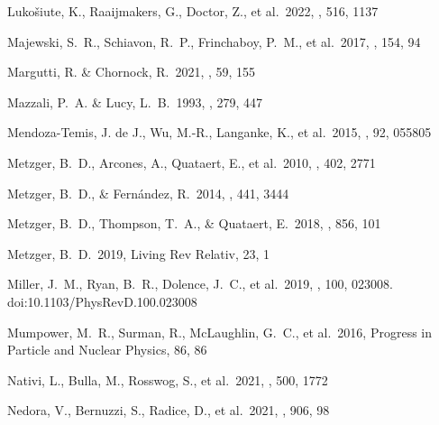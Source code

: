 \documentclass[twocolumn, twocolappendix]{aastex63}
\begin{document}
\begin{thebibliography}{}


 Luko{\v{s}}iute, K., Raaijmakers, G., Doctor, Z., et al.\ 2022, \mnras, 516, 1137


 Majewski, S.~R., Schiavon, R.~P., Frinchaboy, P.~M., et al.\ 2017, \aj, 154, 94

 Margutti, R. \& Chornock, R.\ 2021, \araa, 59, 155

 Mazzali, P.~A. \& Lucy, L.~B.\ 1993, \aap, 279, 447


 Mendoza-Temis, J. de J., Wu, M.-R., Langanke, K., et al.\ 2015, \prc, 92, 055805




 Metzger, B.~D., Arcones, A., Quataert, E., et al.\ 2010, \mnras, 402, 2771




 Metzger, B.~D., \& Fern{\'a}ndez, R.\ 2014, \mnras, 441, 3444


 Metzger, B.~D., Thompson, T.~A., \& Quataert, E.\ 2018, \apj, 856, 101


 Metzger, B.~D.\ 2019, Living Rev Relativ, 23, 1


 Miller, J.~M., Ryan, B.~R., Dolence, J.~C., et al.\ 2019, \prd, 100, 023008. doi:10.1103/PhysRevD.100.023008


 Mumpower, M.~R., Surman, R., McLaughlin, G.~C., et al.\ 2016, Progress in Particle and Nuclear Physics, 86, 86


 Nativi, L., Bulla, M., Rosswog, S., et al.\ 2021, \mnras, 500, 1772


 Nedora, V., Bernuzzi, S., Radice, D., et al.\ 2021, \apj, 906, 98



\end{thebibliography}
\end{document}
